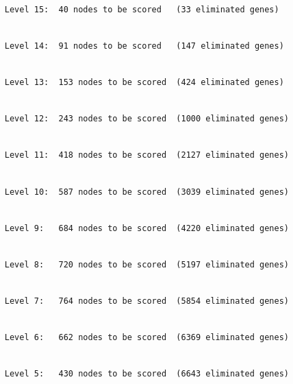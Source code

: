 \documentclass[]{article}
\begin{document}
\begin{verbatim}

     Level 15:  40 nodes to be scored   (33 eliminated genes)
\end{verbatim}

\begin{verbatim}

     Level 14:  91 nodes to be scored   (147 eliminated genes)
\end{verbatim}

\begin{verbatim}

     Level 13:  153 nodes to be scored  (424 eliminated genes)
\end{verbatim}

\begin{verbatim}

     Level 12:  243 nodes to be scored  (1000 eliminated genes)
\end{verbatim}

\begin{verbatim}

     Level 11:  418 nodes to be scored  (2127 eliminated genes)
\end{verbatim}

\begin{verbatim}

     Level 10:  587 nodes to be scored  (3039 eliminated genes)
\end{verbatim}

\begin{verbatim}

     Level 9:   684 nodes to be scored  (4220 eliminated genes)
\end{verbatim}

\begin{verbatim}

     Level 8:   720 nodes to be scored  (5197 eliminated genes)
\end{verbatim}

\begin{verbatim}

     Level 7:   764 nodes to be scored  (5854 eliminated genes)
\end{verbatim}

\begin{verbatim}

     Level 6:   662 nodes to be scored  (6369 eliminated genes)
\end{verbatim}

\begin{verbatim}

     Level 5:   430 nodes to be scored  (6643 eliminated genes)
\end{verbatim}
\end{document}
